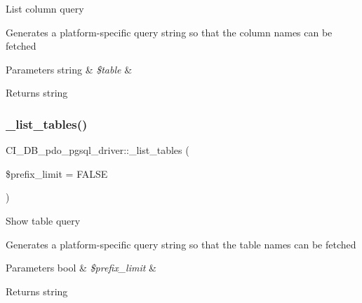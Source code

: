 List column query

Generates a platform-\/specific query string so that the column names can be fetched


\begin{DoxyParams}[1]{Parameters}
string & {\em \$table} & \\
\hline
\end{DoxyParams}
\begin{DoxyReturn}{Returns}
string 
\end{DoxyReturn}
\mbox{\label{class_c_i___d_b__pdo__pgsql__driver_ae656903b5c0a917abd518ba372de10cc}} 
\subsubsection{\texorpdfstring{\+\_\+list\+\_\+tables()}{\_list\_tables()}}
{\footnotesize\ttfamily C\+I\+\_\+\+D\+B\+\_\+pdo\+\_\+pgsql\+\_\+driver\+::\+\_\+list\+\_\+tables (\begin{DoxyParamCaption}\item[{}]{\$prefix\+\_\+limit = {\ttfamily FALSE} }\end{DoxyParamCaption})\hspace{0.3cm}{\ttfamily [protected]}}

Show table query

Generates a platform-\/specific query string so that the table names can be fetched


\begin{DoxyParams}[1]{Parameters}
bool & {\em \$prefix\+\_\+limit} & \\
\hline
\end{DoxyParams}
\begin{DoxyReturn}{Returns}
string 
\end{DoxyReturn}
\mbox{\label{class_c_i___d_b__pdo__pgsql__driver_ad24b27475d709e8da16b1192ce451727}} 
